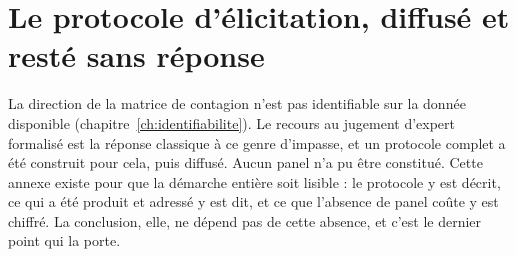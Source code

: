 %
%
%

\chapter{Le protocole d'élicitation, diffusé et resté sans réponse}
\label{ch:elicitation}


La direction de la matrice de contagion n'est pas identifiable sur la donnée disponible
(chapitre~\ref{ch:identifiabilite}). Le recours au jugement d'expert formalisé est la réponse
classique à ce genre d'impasse, et un protocole complet a été construit pour cela, puis diffusé.
Aucun panel n'a pu être constitué. Cette annexe existe pour que la démarche entière soit
lisible : le protocole y est décrit, ce qui a été produit et adressé y est dit, et ce que
l'absence de panel coûte y est chiffré. La conclusion, elle, ne dépend pas de cette absence, et
c'est le dernier point qui la porte.

